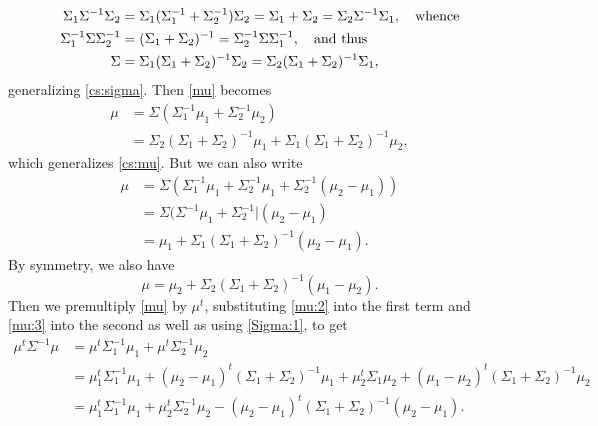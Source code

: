 \documentclass[12pt,leqno]{article}
\begin{document}
\begin{align}
  \Sigma_1\Sigma^{-1}\Sigma_2 &= \Sigma_1(\Sigma_1^{-1}+\Sigma_2^{-1})\Sigma_2 = \Sigma_1+\Sigma_2
  = \Sigma_2\Sigma^{-1}\Sigma_1,\quad\text{whence}\notag\\
  \Sigma_1^{-1}\Sigma\Sigma_2^{-1} &= (\Sigma_1+\Sigma_2)^{-1} = \Sigma_2^{-1}\Sigma\Sigma_1^{-1},\quad\text{and thus}\notag\\
  \Sigma &= \Sigma_1(\Sigma_1 + \Sigma_2)^{-1}\Sigma_2 = \Sigma_2(\Sigma_1+\Sigma_2)^{-1}\Sigma_1,\label{Sigma:1}
\end{align}
generalizing \eqref{cs:sigma}.  Then \eqref{mu} becomes
\begin{equation}\label{mu:1}
  \begin{split}
    \mu &=  \Sigma(\Sigma_1^{-1}\mu_1+\Sigma_2^{-1}\mu_2)\\
    &=\Sigma_2(\Sigma_1+\Sigma_2)^{-1}\mu_1+\Sigma_1(\Sigma_1+\Sigma_2)^{-1}\mu_2,
  \end{split}
\end{equation}
which generalizes \eqref{cs:mu}. But we can also write
\begin{equation}\label{mu:2}
  \begin{split}
  \mu &= \Sigma(\Sigma_1^{-1}\mu_1 + \Sigma_2^{-1}\mu_1 +\Sigma_2^{-1}(\mu_2-\mu_1)) \\
  &= \Sigma(\Sigma^{-1}\mu_1 + \Sigma_2^{-1}|(\mu_2-\mu_1) \\
  &= \mu_1 + \Sigma_1(\Sigma_1+\Sigma_2)^{-1}(\mu_2-\mu_1).
  \end{split}
  \end{equation}
By symmetry, we also have 
\begin{equation}\label{mu:3}
  \mu = \mu_2 + \Sigma_2(\Sigma_1+\Sigma_2)^{-1}(\mu_1-\mu_2).
\end{equation}
Then we premultiply \eqref{mu} by $\mu^t$, substituting \eqref{mu:2} into the first term and
  \eqref{mu:3} into the second as well as using \eqref{Sigma:1}, to get 
\begin{align*}
    \mu^t\Sigma^{-1}\mu &= \mu^t\Sigma_1^{-1}\mu_1 + \mu^t\Sigma_2^{-1}\mu_2 \\
    &= \mu_1^t\Sigma_1^{-1}\mu_1 + (\mu_2-\mu_1)^t(\Sigma_1+\Sigma_2)^{-1}\mu_1
    +\mu_2^t\Sigma_1\mu_2 + (\mu_1-\mu_2)^t(\Sigma_1+\Sigma_2)^{-1}\mu_2\\
    &= \mu_1^t\Sigma_1^{-1}\mu_1 + \mu_2^t\Sigma_2^{-1}\mu_2 - (\mu_2-\mu_1)^t(\Sigma_1+\Sigma_2)^{-1}(\mu_2-\mu_1).
\end{align*}
\end{document}
